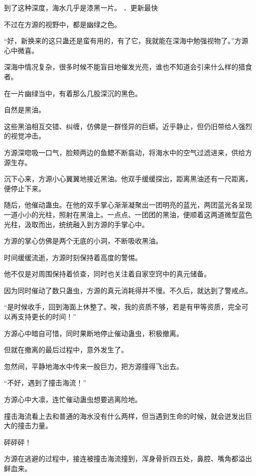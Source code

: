 
\begin{this_body}



到了这种深度，海水几乎是漆黑一片。 ．更新最快

不过在方源的视野中，都是幽绿之色。

“好，新换来的这只蛊还是蛮有用的，有了它，我就能在深海中勉强视物了。”方源心中微喜。

深海中情况复杂，很多时候不能盲目地催发光亮，谁也不知道会引来什么样的猎食者。

在一片幽绿当中，有着那么几股深沉的黑色。

自然是黑油。

这些黑油相互交错、纠缠，仿佛是一群怪异的巨蟒。近乎静止，但仍旧带给人强烈的视觉冲击。

方源深唿吸一口气，脸颊两边的鱼鳃不断翕动，将海水中的空气过滤进来，供给方源生存。

沉下心来，方源小心翼翼地接近黑油。他双手缓缓探出，距离黑油还有一尺距离，便停止下来。

随后，他催动蛊虫。在他的双手掌心渐渐凝聚出一团明亮的蓝光，两团蓝光各呈现一道小小的光柱，照射在黑油上。一点点、一团团的黑油，便顺着这两道微型蓝色光柱，汲取而出，统统融入到方源的手掌心中。

方源的掌心仿佛是两个无底的小洞，不断吸收黑油。

时间缓缓流逝，方源时刻保持着高度的警惕。

他不仅是对周围保持着侦查，同时也关注着自家空窍中的真元储备。

因为同时催动了数只蛊虫，方源的真元消耗得并不慢。不久后，就达到了警戒点。

“是时候收手，回到海面上休整了。唉，我的资质不够，若是有甲等资质，完全可以再支持更长的时间！”

方源心中暗自可惜，同时果断地停止催动蛊虫，积极撤离。

但就在撤离的最后过程中，意外发生了。

忽然间，平静地海水中传来一股巨力，把方源撞得飞出去。

“不好，遇到了撞击海流！”

方源心中大凛，连忙催动蛊虫想要逃离险地。

撞击海流看上去和普通的海水没有什么两样，但当遇到生命的时候，就会迸发出巨大的撞击力量。

砰砰砰！

方源在逃避的过程中，接连被撞击海流撞到，浑身骨折四五处，鼻腔、嘴角都溢出鲜血来。


\end{this_body}
